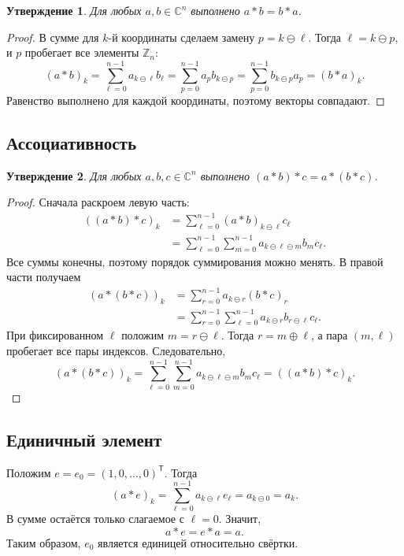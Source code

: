 \documentclass[12pt,a4paper]{article}
\newtheorem{proposition}{Утверждение}
\theoremstyle{definition}
\theoremstyle{remark}
\newcommand{\CC}{\mathbb{C}}
\newcommand{\ZZ}{\mathbb{Z}}
\begin{document}
\begin{proposition}
Для любых $a,b\in\CC^n$ выполнено $a*b=b*a$.
\end{proposition}

\begin{proof}
В сумме для $k$-й координаты сделаем замену $p=k\ominus\ell$.
Тогда $\ell=k\ominus p$, и $p$ пробегает все элементы $\ZZ_n$:
\[
  (a*b)_k
  =\sum_{\ell=0}^{n-1}a_{k\ominus\ell}b_\ell
  =\sum_{p=0}^{n-1}a_pb_{k\ominus p}
  =\sum_{p=0}^{n-1}b_{k\ominus p}a_p
  =(b*a)_k.
\]
Равенство выполнено для каждой координаты, поэтому векторы совпадают.
\end{proof}

\subsection{Ассоциативность}

\begin{proposition}
Для любых $a,b,c\in\CC^n$ выполнено $(a*b)*c=a*(b*c)$.
\end{proposition}

\begin{proof}
Сначала раскроем левую часть:
\begin{align*}
  ((a*b)*c)_k
  &=\sum_{\ell=0}^{n-1}(a*b)_{k\ominus\ell}c_\ell\\
  &=\sum_{\ell=0}^{n-1}\sum_{m=0}^{n-1}
    a_{k\ominus\ell\ominus m}b_mc_\ell.
\end{align*}
Все суммы конечны, поэтому порядок суммирования можно менять.
В правой части получаем
\begin{align*}
  (a*(b*c))_k
  &=\sum_{r=0}^{n-1}a_{k\ominus r}(b*c)_r\\
  &=\sum_{r=0}^{n-1}\sum_{\ell=0}^{n-1}
    a_{k\ominus r}b_{r\ominus\ell}c_\ell.
\end{align*}
При фиксированном $\ell$ положим $m=r\ominus\ell$. Тогда
$r=m\oplus\ell$, а пара $(m,\ell)$ пробегает все пары индексов.
Следовательно,
\[
  (a*(b*c))_k
  =\sum_{\ell=0}^{n-1}\sum_{m=0}^{n-1}
    a_{k\ominus\ell\ominus m}b_mc_\ell
  =((a*b)*c)_k.
\]
\end{proof}

\subsection{Единичный элемент}

Положим $e=e_0=(1,0,\dots,0)^{\mathsf T}$. Тогда
\[
  (a*e)_k=\sum_{\ell=0}^{n-1}a_{k\ominus\ell}e_\ell
  =a_{k\ominus0}=a_k.
\]
В сумме остаётся только слагаемое с $\ell=0$. Значит,
\[
  a*e=e*a=a.
\]
Таким образом, $e_0$ является единицей относительно свёртки.
\end{document}
